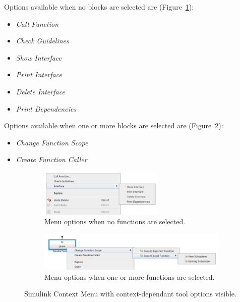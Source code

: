 \documentclass{article}
\newcommand{\menu}[1]{%
	\ifstrequal{#1}{1}{Call Function}{}%
  \ifstrequal{#1}{2}{Create Function Caller}{}%
	\ifstrequal{#1}{3}{Change Function Scope}{}%
	\ifstrequal{#1}{4}{Check Guidelines}{}%
	\ifstrequal{#1}{5}{Show Interface}{}%
	\ifstrequal{#1}{6}{Print Interface}{}%
	\ifstrequal{#1}{7}{Print Dependencies}{}%
	\ifstrequal{#1}{8}{Delete Interface}{}%
}
\begin{document}
\noindent
Options available when no blocks are selected are (Figure~\ref{FIG:none_selected}):
\begin{itemize}
	\item \emph{\menu{1}} %
	\item \emph{\menu{4}}
	\item \emph{\menu{5}} %
	\item \emph{\menu{6}} %
	\item \emph{\menu{8}} %
	\item \emph{\menu{7}} 
\end{itemize}

\noindent
Options available when one or more \simfunc blocks are selected are (Figure~\ref{FIG:simfunc_selected}):
\begin{itemize}
	\item \emph{\menu{3}} %
	\item \emph{\menu{2}} %
\end{itemize}

\begin{figure}[!htb]
    \centering
    \begin{subfigure}[b]{\textwidth}
    \centering
    	\includegraphics[width=0.65\textwidth]{../figs/ContextMenu1}
        \caption{Menu options when no functions are selected.}
        \label{FIG:none_selected}
    \end{subfigure}
    
		\vspace{1em}%
		
    \begin{subfigure}[b]{\textwidth}
    \centering
			\includegraphics[width=\textwidth]{../figs/ContextMenu2}
        \caption{Menu options when one or more functions are selected.}
        \label{FIG:simfunc_selected}
    \end{subfigure}
	\caption{Simulink Context Menu with context-dependant tool options visible.}
	\label{FIG:contextMenu}
\end{figure}
\end{document}
